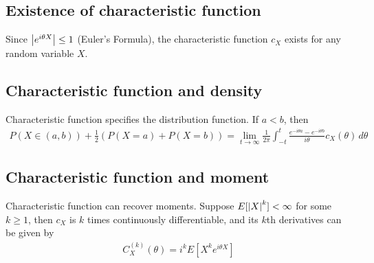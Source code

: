 \subsection{Existence of characteristic function} 
Since $\left| e^{i \theta X} \right| \leq 1$ (Euler's Formula), the characteristic function $c_X$ exists for any random variable $X$.  


\subsection{Characteristic function and density}
Characteristic function specifies the distribution function. If $a < b$, then 
    \begin{align*}
        P\left(X \in (a,b)\right) + \frac{1}{2}\left( P(X=a) + P(X=b) \right) = \lim_{t \to \infty} \frac{1}{2\pi} \int_{-t}^t \frac{e^{-i \theta a} - e^{-i \theta b}}{i \theta} c_X(\theta) \, d\theta
    \end{align*}


\subsection{Characteristic function and moment}
Characteristic function can recover moments. Suppose $E[\left| X \right|^k] < \infty$ for some $k \geq 1$, then $c_X$ is $k$ times continuously differentiable, and its $k$th derivatives can be given by 
    \begin{align*}
        C_X^{(k)}(\theta) = i^k E[X^k e^{i \theta X}]
    \end{align*}


